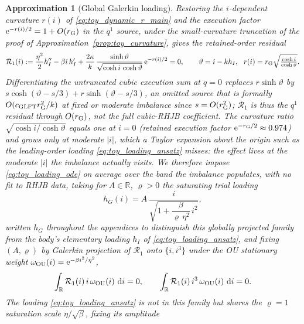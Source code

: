\documentclass[11pt,a4paper]{article}
\newcommand{\R}{\mathbb{R}}
\newcommand{\dd}{\,\mathrm{d}}
\newcommand{\e}{\mathrm e}
\theoremstyle{plain}
\newtheorem{approximation}[proposition]{Approximation}
\theoremstyle{definition}
\begin{document}
\begin{approximation}[Global Galerkin loading]
\label{prop:toy_galerkin}
Restoring the \(i\)-dependent curvature \(r(i)\) of
\eqref{eq:toy_dynamic_r_main} and the execution factor
\(\e^{-r(i)/2}=1+O(r_{\rm G})\) in the \(q^1\) source, under the
small-curvature truncation of the proof of
Approximation~\ref{prop:toy_curvature}, gives the retained-order residual
\begin{equation}
\mathcal R_1(i):=\frac{\eta^2}{2}h_I''-\beta i\,h_I'
+\frac{2\kappa}{k}\,\frac{\sinh\vartheta}{\sqrt{\cosh i\,\cosh\vartheta}}\,
\e^{-r(i)/2}=0 ,\qquad
\vartheta=i-kh_I,\ \ r(i)=r_{\rm G}\sqrt{\tfrac{\cosh i}{\cosh\vartheta}} .
\label{eq:toy_loading_ode}
\end{equation}
Differentiating the untruncated cubic execution sum at \(q=0\) replaces
\(r\sinh\vartheta\) by \(s\cosh(\vartheta-s/3)+r\sinh(\vartheta-s/3)\), an
omitted source that is formally \(O(c_{\rm GLFT}r_{\rm G}^2/k)\) at fixed or
moderate imbalance since \(s=O(r_{\rm G}^2)\); \(\mathcal R_1\) is thus the
\(q^1\) residual through \(O(r_{\rm G})\), not the full cubic-RHJB
coefficient.  The curvature ratio \(\sqrt{\cosh i/\cosh\vartheta}\) equals
one at \(i=0\) (retained execution factor \(\e^{-r_{\rm G}/2}\approx0.974\))
and grows only at moderate \(|i|\), which a Taylor expansion about the
origin such as the leading-order loading \eqref{eq:toy_loading_ansatz}
misses: the effect lives at the moderate \(|i|\) the imbalance actually
visits.  We therefore impose \eqref{eq:toy_loading_ode} \emph{on average}
over the band the imbalance populates, with no fit to RHJB data, taking for
\(A\in\R\), \(\varrho>0\) the saturating trial loading
\begin{equation}
h_G(i)=A\,\frac{i}{\sqrt{1+\dfrac{\beta}{\varrho\,\eta^2}\,i^2}},
\label{eq:toy_galerkin_loading}
\end{equation}
written \(h_G\) throughout the appendices to distinguish this globally
projected family from the body's elementary loading \(h_I\) of
\eqref{eq:toy_loading_ansatz}, and fixing \((A,\varrho)\) by Galerkin
projection of \(\mathcal R_1\) onto \(\{i,i^3\}\) under the OU stationary
weight \(\omega_{\rm OU}(i)=\e^{-\beta i^2/\eta^2}\),
\begin{equation}
\int_{\R} \mathcal R_1(i)\,i\,\omega_{\rm OU}(i)\,\dd i=0,\qquad
\int_{\R} \mathcal R_1(i)\,i^3\,\omega_{\rm OU}(i)\,\dd i=0 .
\label{eq:toy_galerkin_moments}
\end{equation}
The loading \eqref{eq:toy_loading_ansatz} is not in this family but shares
the \(\varrho=1\) saturation scale \(\eta/\sqrt\beta\), fixing its amplitude

\end{approximation}
\end{document}
